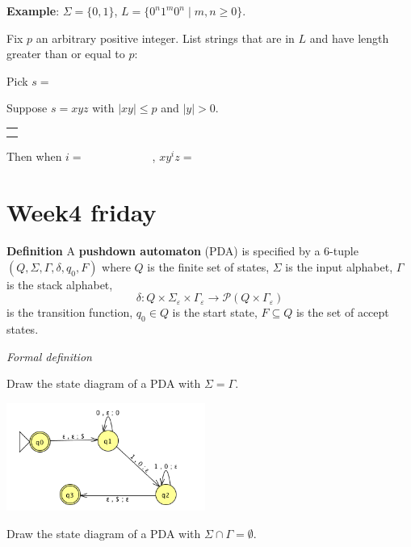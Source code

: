 \documentclass[12pt, oneside]{article}
\begin{document}
\vspace{30pt} 

{\bf Example}: $\Sigma  =  \{0,1\}$, $L = \{0^n1^m0^n  \mid m,n  \geq 0\}$.

Fix $p$ an arbitrary positive integer. List strings that are in $L$ and have length  greater than or equal  to $p$:

\vspace{10pt}

Pick $s = $


Suppose $s = xyz$ with  $|xy|  \leq  p$ and $|y| > 0$.
\begin{center}
\begin{tabular}{|c|}
\hline
 \\
\hspace{4in} \\
\hline
\end{tabular}
\end{center}
Then when $i = \hspace{1in}$, $xy^i z  = \hspace{1in}$
 \vfill
\section*{Week4 friday}


{\bf Definition} A {\bf pushdown automaton} (PDA) is  specified by a  $6$-tuple $(Q, \Sigma, \Gamma, \delta, q_0, F)$
where $Q$ is the finite set of states, $\Sigma$ is the input alphabet,  $\Gamma$ is the stack alphabet,
\[
    \delta: Q \times \Sigma_\varepsilon  \times  \Gamma_\varepsilon \to \mathcal{P}( Q \times \Gamma_\varepsilon)
\]
is the transition function,  $q_0 \in Q$ is the start state, $F \subseteq  Q$ is the set of accept states.
    
\begin{multicols}{2}
    {\it Formal definition}
    
    \vspace{90pt}
    Draw the state diagram of a PDA with $\Sigma = \Gamma$.
    
    \columnbreak 
    \includegraphics[height=100pt]{../../resources/machines/Lect9PDA.png}
    
    
    Draw the state diagram of a PDA with $\Sigma \cap \Gamma = \emptyset$.
    
\end{multicols}
    
\end{document}
